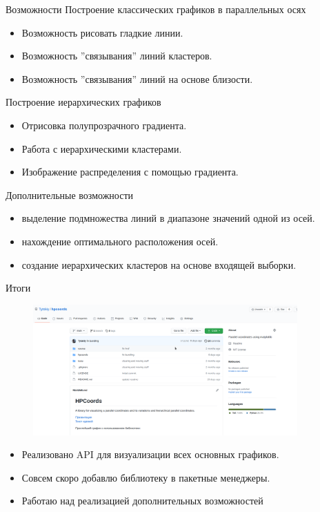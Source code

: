\documentclass[fleqn, xcolor=x11names]{beamer}
\begin{document}
\begin{frame}{Возможности}
    Построение классических графиков в параллельных осях
        \begin{itemize}
            \item Возможность рисовать гладкие линии.
            \item Возможность ''связывания'' линий кластеров.
            \item Возможность ''связывания'' линий на основе близости.
        \end{itemize}

    Построение иерархических графиков
        \begin{itemize}
            \item Отрисовка полупрозрачного градиента.
            \item Работа с иерархическими кластерами.
            \item Изображение распределения с помощью градиента.
        \end{itemize}

    Дополнительные возможности
    \begin{itemize}
        \item выделение подмножества линий в  диапазоне значений одной из осей.
        \item нахождение оптимального расположения осей.
        \item создание иерархических кластеров на основе входящей выборки.
    \end{itemize}
\end{frame}

\begin{frame}{Итоги}
   
    \begin{figure}[htb]
        \centering
        \includegraphics[height=5cm]{github_screen.png}
    \end{figure}
    \begin{itemize}
        \item Реализовано API для визуализации всех основных графиков.
        \item Совсем скоро добавлю библиотеку в пакетные менеджеры.
        \item Работаю над реализацией дополнительных возможностей
    \end{itemize}
    
\end{frame}
\end{document}
